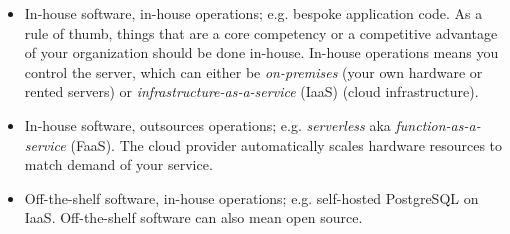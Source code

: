 \documentclass[table, xcdraw]{article}%
\begin{document}
\begin{itemize}
    \item In-house software, in-house operations; e.g. bespoke application code. As a rule of thumb, things that are a core competency or a competitive advantage of your organization should be done in-house. In-house operations means you control the server, which can either be \textit{on-premises} (your own hardware or rented servers) or \textit{infrastructure-as-a-service} (IaaS) (cloud infrastructure).
    \item In-house software, outsources operations; e.g. \textit{serverless} aka \textit{function-as-a-service} (FaaS). The cloud provider automatically scales hardware resources to match demand of your service.
    \item Off-the-shelf software, in-house operations; e.g. self-hosted PostgreSQL on IaaS. Off-the-shelf software can also mean open source.

\end{itemize}
\end{document}
